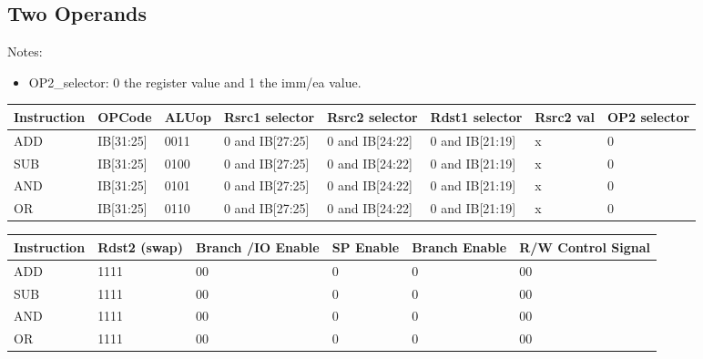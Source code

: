 \documentclass[12pt]{report}
\begin{document}
\subsection{Two Operands}
Notes:
\begin{itemize}
    \item OP2\_selector: 0 the register value and 1 the imm/ea value.
\end{itemize}

\begin{center}
\begin{tabular}{||p{20mm}| p{15mm}| p{15mm}| p{15mm}| p{15mm}| p{15mm}| p{10mm}| p{15mm}||} 
\hline
Instruction & OPCode & ALUop & Rsrc1 selector & Rsrc2 selector & Rdst1 selector & Rsrc2 val & OP2 selector  \\ [0.5ex] 
\hline\hline
ADD & IB[31:25] & 0011 & 0 and IB[27:25] & 0 and IB[24:22] & 0 and IB[21:19] & x & 0 \\
\hline
SUB & IB[31:25] & 0100 & 0 and IB[27:25] & 0 and IB[24:22] & 0 and IB[21:19] & x & 0 \\
\hline
AND & IB[31:25] & 0101 & 0 and IB[27:25] & 0 and IB[24:22] & 0 and IB[21:19] & x & 0 \\
\hline
OR  & IB[31:25] & 0110 & 0 and IB[27:25] & 0 and IB[24:22] & 0 and IB[21:19] & x & 0 \\
\hline

\end{tabular}
\end{center}

\begin{center}
\begin{tabular}{||p{15mm}| p{15mm}| p{15mm}| p{15mm}| p{15mm}| p{15mm}||} 
\hline
Instruction & Rdst2 (swap) & Branch /IO Enable & SP Enable & Branch Enable & R/W Control Signal  \\ [0.5ex] 
\hline\hline
ADD & 1111 & 00 & 0 & 0 & 00 \\
\hline
SUB & 1111 & 00 & 0 & 0 & 00 \\
\hline
AND & 1111 & 00 & 0 & 0 & 00 \\
\hline
OR  & 1111 & 00 & 0 & 0 & 00 \\
\hline

\end{tabular}
\end{center}
\end{document}

